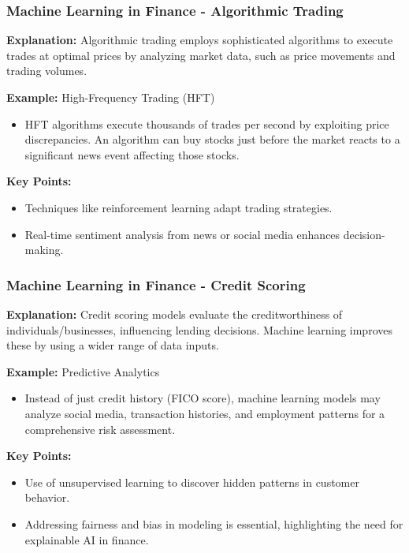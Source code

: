 \documentclass[aspectratio=169]{beamer}
\begin{document}
\begin{frame}[fragile]
    \frametitle{Machine Learning in Finance - Algorithmic Trading}
    \textbf{Explanation:} Algorithmic trading employs sophisticated algorithms to execute trades at optimal prices by analyzing market data, such as price movements and trading volumes.

    \textbf{Example:} High-Frequency Trading (HFT)
    \begin{itemize}
        \item HFT algorithms execute thousands of trades per second by exploiting price discrepancies. An algorithm can buy stocks just before the market reacts to a significant news event affecting those stocks.
    \end{itemize}
    
    \textbf{Key Points:}
    \begin{itemize}
        \item Techniques like reinforcement learning adapt trading strategies.
        \item Real-time sentiment analysis from news or social media enhances decision-making.
    \end{itemize}
\end{frame}

\begin{frame}[fragile]
    \frametitle{Machine Learning in Finance - Credit Scoring}
    \textbf{Explanation:} Credit scoring models evaluate the creditworthiness of individuals/businesses, influencing lending decisions. Machine learning improves these by using a wider range of data inputs.

    \textbf{Example:} Predictive Analytics
    \begin{itemize}
        \item Instead of just credit history (FICO score), machine learning models may analyze social media, transaction histories, and employment patterns for a comprehensive risk assessment.
    \end{itemize}
    
    \textbf{Key Points:}
    \begin{itemize}
        \item Use of unsupervised learning to discover hidden patterns in customer behavior.
        \item Addressing fairness and bias in modeling is essential, highlighting the need for explainable AI in finance.
    \end{itemize}
\end{frame}
\end{document}

